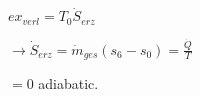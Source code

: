 \( ex_{verl} = T_0 \dot{S}_{erz} \)  

\( \rightarrow \dot{S}_{erz} = \dot{m}_{ges} \left( s_6 - s_0 \right) = \frac{\dot{Q}}{T} \)  

\( = 0 \) adiabatic.